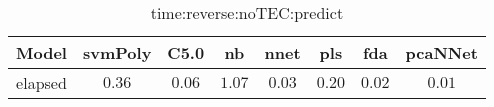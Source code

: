 \begin{table}[!ht]
	\centering
	\begin{tabular}{|c|c|c|c|c|c|c|c|}
		\hline
		Model & svmPoly & C5.0 & nb & nnet & pls & fda & pcaNNet \\ \hline
		elapsed & $0.36$ & $0.06$ & $1.07$ & $0.03$ & $0.20$ & $0.02$ & $0.01$ \\ \hline
	\end{tabular}
	\caption{time:reverse:noTEC:predict}
	\label{tab:time:reverse:noTEC:predict}
\end{table}
